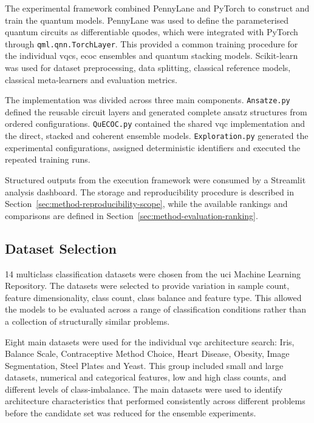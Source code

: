 \documentclass[]{UCD_CS_MSc_AAI_Report}
\begin{document}
The experimental framework combined PennyLane and PyTorch to construct and train the quantum models. PennyLane was used to define the parameterised quantum circuits as differentiable \glspl{qnode}, which were integrated with PyTorch through \texttt{qml.qnn.TorchLayer}. This provided a common training procedure for the individual \acp{vqc}, \ac{ecoc} ensembles and quantum stacking models. Scikit-learn was used for dataset preprocessing, data splitting, classical reference models, classical meta-learners and evaluation metrics.

The implementation was divided across three main components. \texttt{Ansatze.py} defined the reusable circuit layers and generated complete ansatz structures from ordered configurations. \texttt{QuECOC.py} contained the shared \ac{vqc} implementation and the direct, stacked and coherent ensemble models. \texttt{Exploration.py} generated the experimental configurations, assigned deterministic identifiers and executed the repeated training runs.

Structured outputs from the execution framework were consumed by a Streamlit analysis dashboard. The storage and reproducibility procedure is described in Section~\ref{sec:method-reproducibility-scope}, while the available rankings and comparisons are defined in Section~\ref{sec:method-evaluation-ranking}.

\subsection{Dataset Selection}

14 multiclass classification datasets were chosen from the \ac{uci} Machine Learning Repository. The datasets were selected to provide variation in sample count, feature dimensionality, class count, class balance and feature type. This allowed the models to be evaluated across a range of classification conditions rather than a collection of structurally similar problems.

Eight main datasets were used for the individual \ac{vqc} architecture search: Iris, Balance Scale, Contraceptive Method Choice, Heart Disease, Obesity, Image Segmentation, Steel Plates and Yeast. This group included small and large datasets, numerical and categorical features, low and high class counts, and different levels of \gls{class-imbalance}. The main datasets were used to identify architecture characteristics that performed consistently across different problems before the candidate set was reduced for the ensemble experiments.
\end{document}
